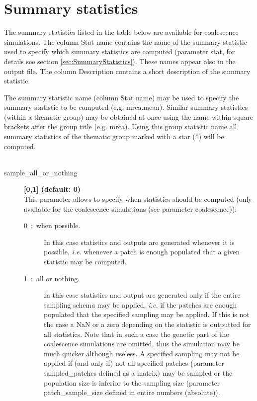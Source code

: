 \documentclass[letterpaper,12pt,oneside]{book}
\begin{document}
\begin{description}
\end{description}

\section{Summary statistics}\label{ssCoal}
The summary statistics listed in the table below are available for coalescence simulations. The column \textsf{Stat name} contains the name of the summary statistic used to specify which summary statistics are computed (parameter \textsf{stat}, for details see section \ref{sec:SummaryStatistics}). These names appear also in the output file. The column \textsf{Description} contains a short description of the summary statistic. 

The summary statistic name (column \textsf{Stat name}) may be used to specify the summary statistic to be computed (e.g. \textsf{mrca.mean}). Similar summary statistics (within a thematic group) may be obtained at once using the name within square brackets after the group title (e.g. \textsf{mrca}). Using this group statistic name all summary statistics of the thematic group marked with a star (*) will be computed. 
\\
\\
\begin{description}
\item[sample\_all\_or\_nothing] \textbf{[0,1] (default: 0)}\\
This parameter allows to specify when statistics should be computed (only available for the coalescence simulations (see parameter \textsf{coalescence})):
\begin{description}
\item[0~:~when possible.] In this case statistics and outputs are generated whenever it is possible, \textit{i.e.} whenever a patch is enough populated that a given statistic may be computed.
\item[1~:~all or nothing.] In this case statistics and output are generated only if the entire sampling schema may be applied, \textit{i.e.} if the patches are enough populated that the specified sampling may be applied. If this is not the case a NaN or a zero depending on the statistic is outputted for all statistics. Note that in such a case the genetic part of the coalescence simulations are omitted, thus the simulation may be much quicker although useless. A specified sampling may not be applied if (and only if) not all specified patches (parameter \textsf{sampled\_patches} defined as a matrix) may be sampled or the population size is inferior to the sampling size (parameter \textsf{patch\_sample\_size} defined in entire numbers (absolute)).
\end{description}
\end{description}
\end{document}
